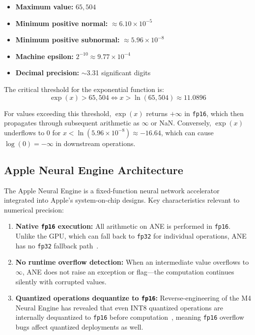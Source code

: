 \documentclass[10pt,twocolumn]{article}
\newcommand{\fp}{\texttt{fp16}}
\newcommand{\fpt}{\texttt{fp32}}
\newcommand{\ane}{ANE}
\begin{document}
\begin{itemize}[leftmargin=*,itemsep=1pt]
  \item \textbf{Maximum value:} $65{,}504$
  \item \textbf{Minimum positive normal:} $\approx 6.10 \times 10^{-5}$
  \item \textbf{Minimum positive subnormal:} $\approx 5.96 \times 10^{-8}$
  \item \textbf{Machine epsilon:} $2^{-10} \approx 9.77 \times 10^{-4}$
  \item \textbf{Decimal precision:} $\sim$3.31 significant digits
\end{itemize}

The critical threshold for the exponential function is:
\begin{equation}
  \exp(x) > 65{,}504 \iff x > \ln(65{,}504) \approx 11.0896
  \label{eq:overflow_threshold}
\end{equation}

For values exceeding this threshold, $\exp(x)$ returns $+\infty$ in
\fp{}, which then propagates through subsequent arithmetic as
$\infty$ or NaN.  Conversely, $\exp(x)$ underflows to 0 for
$x < \ln(5.96 \times 10^{-8}) \approx -16.64$, which can cause
$\log(0) = -\infty$ in downstream operations.

\subsection{Apple Neural Engine Architecture}
\label{sec:ane}

The Apple Neural Engine is a fixed-function neural network
accelerator integrated into Apple's system-on-chip designs.  Key
characteristics relevant to numerical precision:

\begin{enumerate}[leftmargin=*,itemsep=1pt]
  \item \textbf{Native \fp{} execution:} All arithmetic on \ane{}
    is performed in \fp{}.  Unlike the GPU, which can fall back to
    \fpt{} for individual operations, \ane{} has no \fpt{} fallback
    path~\citep{maderix2025ane}.

  \item \textbf{No runtime overflow detection:} When an intermediate
    value overflows to $\infty$, \ane{} does not raise an exception
    or flag---the computation continues silently with corrupted
    values.

  \item \textbf{Quantized operations dequantize to \fp{}:} Reverse-engineering
    of the M4 Neural Engine has revealed that even INT8 quantized operations are
    internally dequantized to \fp{} before computation~\citep{maderix2025ane},
    meaning \fp{} overflow bugs affect quantized deployments as well.
\end{enumerate}
\end{document}
